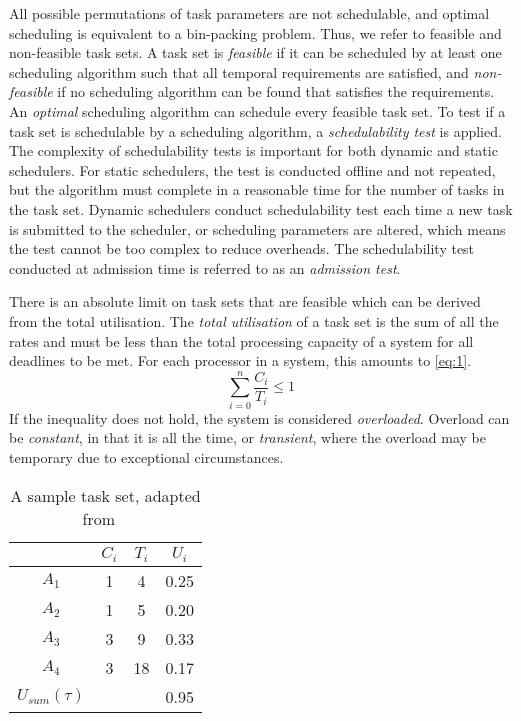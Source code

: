 All possible permutations of task parameters are not schedulable, and optimal scheduling is
equivalent to a bin-packing problem. Thus, we refer to feasible and non-feasible task sets. 
A task set is \emph{feasible} if it can be scheduled by at least one scheduling algorithm such that
all temporal requirements are satisfied, and \emph{non-feasible} if no scheduling algorithm can be found
that satisfies the requirements.
An \emph{optimal} scheduling algorithm can schedule every feasible task set.
To test if a task set is schedulable by a scheduling algorithm, a \emph{schedulability test} is applied.
The complexity of schedulability tests is important for both dynamic and static schedulers. For
static schedulers, the test is conducted offline and not repeated, but the algorithm must complete
in a reasonable time for the number of tasks in the task set. Dynamic schedulers conduct
schedulability test each time a new task is submitted to the scheduler, or scheduling parameters are
altered, which means the test cannot be too complex to reduce overheads. The schedulability test conducted at admission time is
referred to as an \emph{admission test}.

There is an absolute limit on task sets that are feasible which can be derived from the total
utilisation. 
The \emph{total utilisation} of a task set is the sum of all the rates and must be less than the
total processing capacity of a system for all deadlines to be met.
For each processor in a system, this amounts to \cref{eq:1}.
\begin{equation}
    \label{eq:1}
	\sum\limits_{i=0}^n \dfrac{C_{i}}{T_{i}} \leq 1
\end{equation}
If the inequality does not hold, the system is considered \emph{overloaded}. Overload
can be \emph{constant}, in that it is all the time, or \emph{transient}, where the overload may be
temporary due to exceptional circumstances.

\begin{table}
    \centering
    \begin{tabular}{cccc} \toprule
        & \emph{$C_{i}$} & $T_{i}$ & $U_{i} $ \\ \midrule
			$ A_{1}$ & 1 & 4 & 0.25 \\
			$ A_{2}$ & 1 & 5 & 0.20 \\
			$ A_{3}$ & 3 & 9 & 0.33 \\
			$ A_{4}$ & 3 & 18 & 0.17  \\\midrule 
	$ U_{sum}(\tau)$ & &  & 0.95 \\ \bottomrule
	\end{tabular}
    \caption[A sample task set.]{A sample task set, adapted from ~\citep{Brandenburg:phd}}
	\label{tab:example_task_set}
\end{table}

